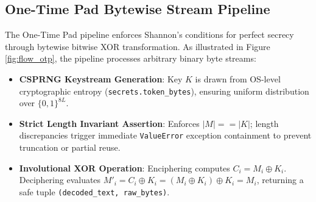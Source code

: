 \documentclass[12pt,a4paper]{report}
\begin{document}
\clearpage

\subsection{One-Time Pad Bytewise Stream Pipeline}
The One-Time Pad pipeline enforces Shannon's conditions for perfect secrecy through bytewise bitwise XOR transformation. As illustrated in Figure \ref{fig:flow_otp}, the pipeline processes arbitrary binary byte streams:
\begin{itemize}[leftmargin=1.5em,topsep=1pt,itemsep=1pt,parsep=0pt]
    \item \textbf{CSPRNG Keystream Generation}: Key $K$ is drawn from OS-level cryptographic entropy (\texttt{secrets.token\_bytes}), ensuring uniform distribution over $\{0, 1\}^{8L}$.
    \item \textbf{Strict Length Invariant Assertion}: Enforces $|M| == |K|$; length discrepancies trigger immediate \texttt{ValueError} exception containment to prevent truncation or partial reuse.
    \item \textbf{Involutional XOR Operation}: Enciphering computes $C_i = M_i \oplus K_i$. Deciphering evaluates $M'_i = C_i \oplus K_i = (M_i \oplus K_i) \oplus K_i = M_i$, returning a safe tuple \texttt{(decoded\_text, raw\_bytes)}.
\end{itemize}
\end{document}
